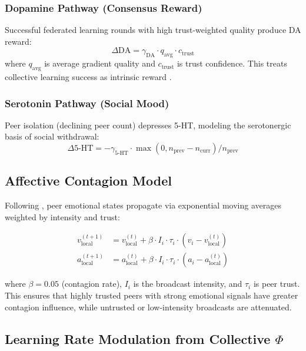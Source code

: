 \documentclass[11pt,a4paper]{article}
\begin{document}
\subsubsection{Dopamine Pathway (Consensus Reward)}
Successful federated learning rounds with high trust-weighted quality produce DA reward:
\begin{equation}
\Delta \text{DA} = \gamma_{\text{DA}} \cdot q_{\text{avg}} \cdot c_{\text{trust}}
\end{equation}
where $q_{\text{avg}}$ is average gradient quality and $c_{\text{trust}}$ is trust confidence. This treats collective learning success as intrinsic reward \citep{schultz1997}.

\subsubsection{Serotonin Pathway (Social Mood)}
Peer isolation (declining peer count) depresses 5-HT, modeling the serotonergic basis of social withdrawal:
\begin{equation}
\Delta \text{5-HT} = -\gamma_{\text{5-HT}} \cdot \max(0, n_{\text{prev}} - n_{\text{curr}}) / n_{\text{prev}}
\end{equation}

\subsection{Affective Contagion Model}

Following \citet{hatfield1993}, peer emotional states propagate via exponential moving averages weighted by intensity and trust:

\begin{align}
v_{\text{local}}^{(t+1)} &= v_{\text{local}}^{(t)} + \beta \cdot I_i \cdot \tau_i \cdot (v_i - v_{\text{local}}^{(t)}) \\
a_{\text{local}}^{(t+1)} &= a_{\text{local}}^{(t)} + \beta \cdot I_i \cdot \tau_i \cdot (a_i - a_{\text{local}}^{(t)})
\end{align}

\noindent where $\beta = 0.05$ (contagion rate), $I_i$ is the broadcast intensity, and $\tau_i$ is peer trust. This ensures that highly trusted peers with strong emotional signals have greater contagion influence, while untrusted or low-intensity broadcasts are attenuated.

\subsection{Learning Rate Modulation from Collective $\Phi$}
\end{document}

